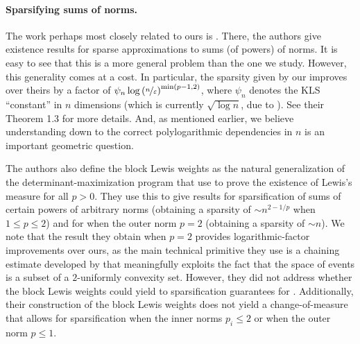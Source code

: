 \documentclass[11pt]{article}
\numberwithin{equation}{section}
\begin{document}

\paragraph{Sparsifying sums of norms.} The work perhaps most closely related to ours is \cite{jlls23}. There, the authors give existence results for sparse approximations to sums (of powers) of norms. It is easy to see that this is a more general problem than the one we study. However, this generality comes at a cost. In particular, the sparsity given by our  improves over theirs by a factor of $\psi_n\log\left(\nicefrac{n}{\varepsilon}\right)^{\min(p-1,2)}$, where $\psi_n$ denotes the KLS ``constant'' in $n$ dimensions (which is currently $\sqrt{\log n}$, due to \citet{kla23}). See their Theorem 1.3 for more details. And, as mentioned earlier, we believe understanding  down to the correct polylogarithmic dependencies in $n$ is an important geometric question.

The authors also define the block Lewis weights as the natural generalization of the determinant-maximization program that \citet{sz01} use to prove the existence of Lewis's measure for all $p > 0$. They use this to give results for sparsification of sums of certain powers of arbitrary norms (obtaining a sparsity of $\sim n^{2-1/p}$ when $1 \le p \le 2$) and for  when the outer norm $p=2$ (obtaining a sparsity of $\sim n$). We note that the result they obtain when $p=2$ provides logarithmic-factor improvements over ours, as the main technical primitive they use is a chaining estimate developed by \citet{lee22} that meaningfully exploits the fact that the space of events is a subset of a $2$-uniformly convexity set. However, they did not address whether the block Lewis weights could yield to sparsification guarantees for . Additionally, their construction of the block Lewis weights does not yield a change-of-measure that allows for sparsification when the inner norms $p_i \le 2$ or when the outer norm $p \le 1$. 
\end{document}
